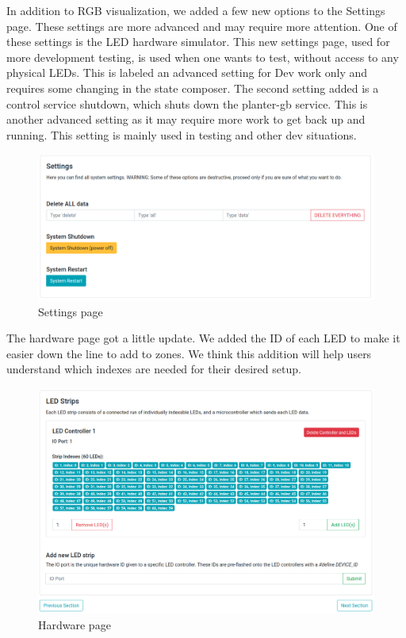 \documentclass[onecolumn, draftclsnofoot,10pt, compsoc]{IEEEtran}
\begin{document}
		\noindent In addition to RGB visualization, we added a few new options to the Settings page. These settings are more advanced and may require more attention.
		One of these settings is the LED hardware simulator. This new settings page, used for more development testing, is used when one wants to test, without
		access to any physical LEDs. This is labeled an advanced setting for Dev work only and requires some changing in the state composer. The second setting added is a control
		service shutdown, which shuts down the planter-gb service. This is another advanced setting as it may require more work to get back up and running.
		This setting is mainly used in testing and other dev situations.

		\begin{center}
			\begin{figure}[H]
				\includegraphics[width=\linewidth]{site/settings.png}
				\caption{Settings page}
				\label{fig:siteSettings}
			\end{figure}
		\end{center}
		\noindent The hardware page got a little update. We added the ID of each LED to make it easier down the line to add to zones. We think this addition
		will help users understand which indexes are needed for their desired setup.
		\begin{center}
			\begin{figure}[H]
				\includegraphics[width=\linewidth]{site/hardware.png}
				\caption{Hardware page}
				\label{fig:siteHardware}
			\end{figure}
		\end{center}
\end{document}

